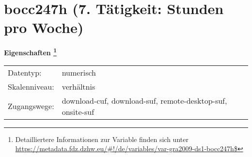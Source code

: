 
    \setcounter{footnote}{0}

    \vspace*{-1.8cm}
	\section{bocc247h (7. Tätigkeit: Stunden pro Woche)}
	\label{section:bocc247h}



    \vspace*{0.5cm}
    \noindent\textbf{Eigenschaften
	\footnote{Detailliertere Informationen zur Variable finden sich unter
		\url{https://metadata.fdz.dzhw.eu/\#!/de/variables/var-gra2009-ds1-bocc247h$}}}\\
	\begin{tabularx}{\hsize}{@{}lX}
	Datentyp: & numerisch \\
	Skalenniveau: & verhältnis \\
	Zugangswege: &
	  download-cuf, 
	  download-suf, 
	  remote-desktop-suf, 
	  onsite-suf
 \\
    \end{tabularx}



